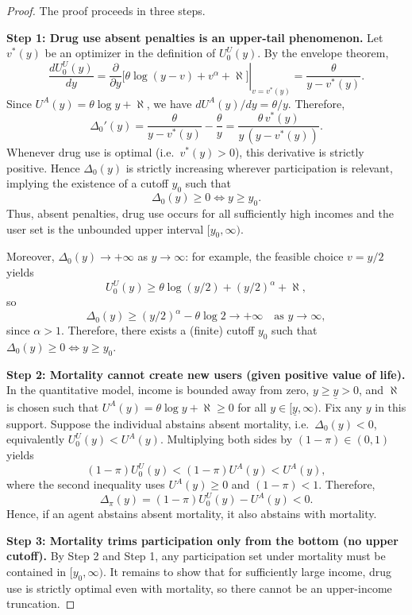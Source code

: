 \begin{proof} The proof proceeds in three steps.

\medskip
\noindent\textbf{Step 1: Drug use absent penalties is an upper-tail phenomenon.} Let $v^\ast(y)$ be an optimizer in the definition of $U_0^U(y)$. By the envelope theorem,
\[
\frac{dU_0^U(y)}{dy}
=\left.\frac{\partial}{\partial y}\Big[\theta\log(y-v)+v^\alpha+\aleph\Big]\right|_{v=v^\ast(y)}
=\frac{\theta}{y-v^\ast(y)}.
\]
Since $U^A(y)=\theta\log y+\aleph$, we have $dU^A(y)/dy=\theta/y$. Therefore,
\[
\Delta_0'(y)
=\frac{\theta}{y-v^\ast(y)}-\frac{\theta}{y}
=\frac{\theta\,v^\ast(y)}{y\,(y-v^\ast(y))}.
\]
Whenever drug use is optimal (i.e.\ $v^\ast(y)>0$), this derivative is strictly positive. Hence $\Delta_0(y)$ is strictly increasing wherever participation is relevant, implying the existence of a cutoff $y_0$ such that
\[
\Delta_0(y)\ge 0 \iff y\ge y_0.
\]
Thus, absent penalties, drug use occurs for all sufficiently high incomes and the user set is the unbounded upper interval $[y_0,\infty)$.

Moreover, $\Delta_0(y)\to+\infty$ as $y\to\infty$: for example, the feasible choice $v=y/2$ yields
\[
U_0^U(y)\ge \theta\log(y/2)+(y/2)^\alpha+\aleph,
\]
so
\[
\Delta_0(y)\ge (y/2)^\alpha - \theta\log 2 \to +\infty
\quad\text{as } y\to\infty,
\]
since $\alpha>1$. Therefore, there exists a (finite) cutoff $y_0$ such that $\Delta_0(y)\ge 0 \iff y\ge y_0$.

\medskip
\noindent\textbf{Step 2: Mortality cannot create new users (given positive value of life).}
In the quantitative model, income is bounded away from zero, $y\ge \underline y>0$, and $\aleph$ is chosen such that
$U^A(y)=\theta\log y+\aleph\ge 0$ for all $y\in[\underline y,\infty)$.
Fix any $y$ in this support. Suppose the individual abstains absent mortality, i.e.\ $\Delta_0(y)<0$, equivalently
$U_0^U(y)<U^A(y)$. Multiplying both sides by $(1-\pi)\in(0,1)$ yields
\[
(1-\pi)U_0^U(y) < (1-\pi)U^A(y) < U^A(y),
\]
where the second inequality uses $U^A(y)\ge 0$ and $(1-\pi)<1$.
Therefore,
\[
\Delta_\pi(y)=(1-\pi)U_0^U(y)-U^A(y)<0.
\]
Hence, if an agent abstains absent mortality, it also abstains with mortality.

\medskip
\noindent\textbf{Step 3: Mortality trims participation only from the bottom (no upper cutoff).}
By Step 2 and Step 1, any participation set under mortality must be contained in $[y_0,\infty)$.
It remains to show that for sufficiently large income, drug use is strictly optimal even with mortality,
so there cannot be an upper-income truncation.


\end{proof}

